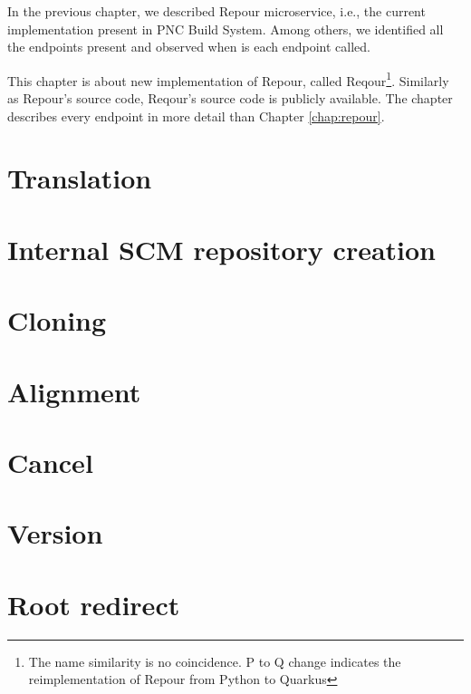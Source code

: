 \documentclass[../../main.tex]{subfiles}
\begin{document}
In the previous chapter, we described Repour microservice, i.e., the current implementation present in PNC Build System. Among others, we identified all the endpoints present and observed when is each endpoint called.

This chapter is about new implementation of Repour, called Reqour\footnote{The name similarity is no coincidence. P to Q change indicates the reimplementation of Repour from Python to Quarkus}. Similarly as Repour's source code, Reqour's source code is publicly available\cite{reqour}. The chapter describes every endpoint in more detail than Chapter \ref{chap:repour}.

\section{Translation}


\section{Internal SCM repository creation}


\section{Cloning}


\section{Alignment}
\label{section:alignment}


\section{Cancel}


\section{Version}


\section{Root redirect}

\end{document}
